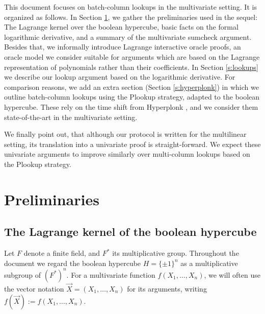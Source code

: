 \documentclass[11pt]{article}
\theoremstyle{definition}
\theoremstyle{definition}
\begin{document}
This document focuses on batch-column lookups in the multivariate setting.
It is organized as follows.
In Section \ref{s:preliminaries}, we gather the preliminaries used in the sequel: 
The Lagrange kernel over the boolean hypercube,  basic facts on the formal logarithmic derivative, and a summary of the multivariate sumcheck argument. 
Besides that, we informally introduce Lagrange interactive oracle proofs, an oracle model we consider suitable for arguments which are based on the Lagrange representation of polynomials rather than their coefficients.   
In Section \ref{s:lookups} we describe our lookup argument based on the logarithmic derivative. 
For comparison reasons, we add an extra section (Section \ref{s:hyperplonk}) in which we outline batch-column lookups using the Plookup strategy, adapted to the boolean hypercube. 
These rely on the time shift from Hyperplonk \cite{Hyperplonk}, and we consider them state-of-the-art in the multivariate setting.

We finally point out, that although our protocol is written for the multilinear setting, its translation into a univariate proof is straight-forward.
We expect these univariate arguments to improve similarly over multi-column lookups based on the Plookup strategy.






\section{Preliminaries}
\label{s:preliminaries}

\subsection{The Lagrange kernel of the boolean hypercube}

Let $F$ denote a finite field, and $F^*$ its multiplicative group.
Throughout the document we regard the boolean hypercube $H= \{\pm 1\}^n$  as a multiplicative subgroup of  $(F^*)^n$.
For a multivariate function $f(X_1,\ldots, X_n)$, we will often use the vector notation $\vec X = (X_1,\ldots, X_n)$ for its arguments, writing $f(\vec X) := f(X_1,\ldots, X_n)$.
 
\end{document}
